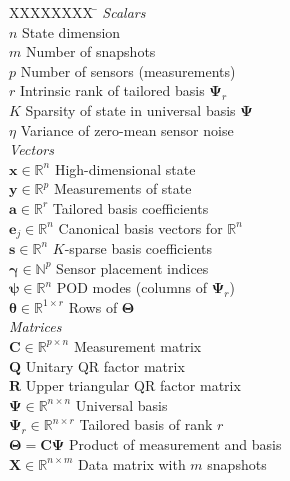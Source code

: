 \documentclass[letterpaper]{IEEEtran}
\newcommand{\ba}{\mathbf{a}}
\newcommand{\be}{\mathbf{e}}
\newcommand{\bx}{\mathbf{x}}
\newcommand{\by}{\mathbf{y}}
\newcommand{\bs}{\mathbf{s}}
\newcommand{\bC}{\mathbf{C}}
\newcommand{\bR}{\mathbf{R}}
\newcommand{\bQ}{\mathbf{Q}}
\newcommand{\bX}{\mathbf{X}}
\newcommand{\bPsi}{\mathbf{\Psi}}
\newcommand{\bpsi}{\boldsymbol\psi}
\newcommand{\bTheta}{\mathbf{\Theta}}
\newcommand{\reals}{\mathbb{R}}
\newcommand{\btheta}{\boldsymbol{\theta}}
\newcommand{\Ind}{\boldsymbol{\gamma}}
\begin{document}

\begin{tabbing}
  XXXXXXXX \= \kill%
   \textit{Scalars} \>  \\
  $n$ \> State dimension \\
  $m$ \> Number of snapshots \\
    $p$ \> Number of sensors (measurements) \\  
  $r$ \> Intrinsic rank of tailored basis $\bPsi_r$\\ 
    $K$ \> Sparsity of state in universal basis $\bPsi$\\
    $\eta$ \> Variance of zero-mean sensor noise \\[5pt]
  \textit{Vectors} \> \\
  $\bx\in\reals^n$ \> High-dimensional state \\  
  $\by\in\reals^p$ \> Measurements of state \\
  $\ba\in\reals^r$ \> Tailored basis coefficients \\
  $\be_j\in\reals^n$ \> Canonical basis vectors for $\reals^n$ \\
  $\bs\in\reals^n$ \> $K$-sparse basis coefficients\\
  $\Ind\in\mathbb{N}^p$ \> Sensor placement indices \\
  $\bpsi\in\reals^n$ \> POD modes (columns of $\bPsi_r$) \\ 
  $\btheta\in\reals^{1\times r}$ \> Rows of $\bTheta$ \\ [5pt]
   \textit{Matrices} \> \\
  $\bC\in\reals^{p\times n}$ \> Measurement matrix \\
  $\bQ$ \> Unitary QR factor matrix \\
  $\bR$ \> Upper triangular QR factor matrix\\
  $\bPsi\in\reals^{n\times n}$ \> Universal basis \\
  $\bPsi_r\in\reals^{n\times r}$ \> Tailored basis of rank $r$ \\
  $\bTheta=\bC\bPsi$ \> Product of measurement and basis  \\
  $\bX\in\mathbb{R}^{n\times m}$ \> Data matrix with $m$ snapshots\\
 \end{tabbing}

\vspace{-2em}
\end{document}
